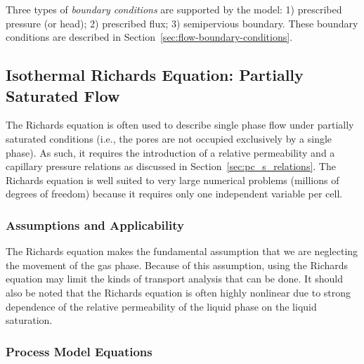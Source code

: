 Three types of \textit{boundary conditions} are supported by the model:
1) prescribed pressure (or head);
2) prescribed flux;
3) semipervious boundary. %
These boundary conditions are described in Section~\ref{sec:flow-boundary-conditions}.



\subsection{Isothermal Richards Equation: Partially Saturated Flow}
\label{sec:richards-equation}

The Richards equation is often used to describe single phase flow under partially 
saturated conditions (i.e., the pores are not occupied exclusively by a single phase).  
As such, it requires the introduction of a relative permeability and a capillary 
pressure relations as discussed in Section~\ref{sec:pc_s_relations}.
The Richards equation is well suited to very large numerical problems (millions of 
degrees of freedom) because it requires only one independent variable per cell.


\subsubsection{Assumptions and Applicability}

The Richards equation makes the fundamental assumption that we are neglecting
the movement of the gas phase.
Because of this assumption, using the Richards equation may limit the kinds of 
transport analysis that can be done.
It should also be noted that the Richards equation is often highly nonlinear
due to strong dependence of the relative permeability of the liquid phase
on the liquid saturation.


\subsubsection{Process Model Equations} 
\label{sec:richards-model-equations}

